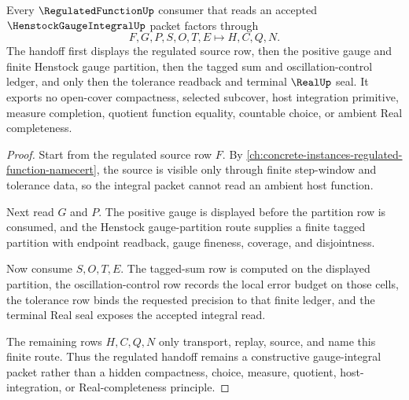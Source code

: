 \begin{theorem}
\label{thm:henstock-gauge-integral-regulated-handoff}
Every $\RegulatedFunctionUp$ consumer that reads an accepted $\HenstockGaugeIntegralUp$ packet factors through
$$
F,G,P,S,O,T,E \longmapsto H,C,Q,N .
$$
The handoff first displays the regulated source row, then the positive gauge and finite Henstock gauge partition, then the tagged sum and oscillation-control ledger, and only then the tolerance readback and terminal $\RealUp$ seal. It exports no open-cover compactness, selected subcover, host integration primitive, measure completion, quotient function equality, countable choice, or ambient Real completeness.
\end{theorem}
\begin{proof}
Start from the regulated source row $F$. By \autoref{ch:concrete-instances-regulated-function-namecert}, the source is visible only through finite step-window and tolerance data, so the integral packet cannot read an ambient host function.

Next read $G$ and $P$. The positive gauge is displayed before the partition row is consumed, and the Henstock gauge-partition route supplies a finite tagged partition with endpoint readback, gauge fineness, coverage, and disjointness.

Now consume $S,O,T,E$. The tagged-sum row is computed on the displayed partition, the oscillation-control row records the local error budget on those cells, the tolerance row binds the requested precision to that finite ledger, and the terminal Real seal exposes the accepted integral read.

The remaining rows $H,C,Q,N$ only transport, replay, source, and name this finite route. Thus the regulated handoff remains a constructive gauge-integral packet rather than a hidden compactness, choice, measure, quotient, host-integration, or Real-completeness principle.
\end{proof}



